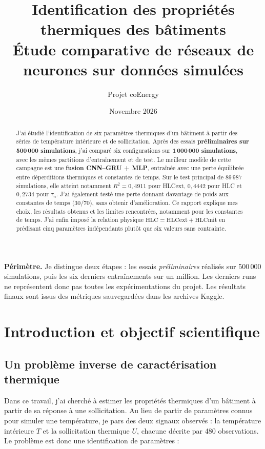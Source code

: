 \documentclass[10pt,a4paper]{article}
\title{\textbf{Identification des propriétés thermiques des bâtiments}\\[0.4em]
       \large Étude comparative de réseaux de neurones sur données simulées}
\author{Projet coEnergy}
\date{Novembre 2026}
\begin{document}
\maketitle
\vspace{-1.4em}
\begin{abstract}
J'ai étudié l'identification de six paramètres thermiques d'un bâtiment à partir des séries de température intérieure et de sollicitation. Après des essais \textbf{préliminaires sur 500\,000 simulations}, j'ai comparé six configurations sur \textbf{1\,000\,000 simulations}, avec les mêmes partitions d'entraînement et de test. Le meilleur modèle de cette campagne est une \textbf{fusion CNN--GRU + MLP}, entraînée avec une perte équilibrée entre déperditions thermiques et constantes de temps. Sur le test principal de 89\,987 simulations, elle atteint notamment $R^2=0{,}4911$ pour HLCext, $0{,}4442$ pour HLC et $0{,}2734$ pour $\tau_n$. J'ai également testé une perte donnant davantage de poids aux constantes de temps (30/70), sans obtenir d'amélioration. Ce rapport explique mes choix, les résultats obtenus et les limites rencontrées, notamment pour les constantes de temps. J'ai enfin imposé la relation physique $\mathrm{HLC}=\mathrm{HLCext}+\mathrm{HLCmit}$ en prédisant cinq paramètres indépendants plutôt que six valeurs sans contrainte.

\end{abstract}

\vspace{-0.25em}
\tableofcontents
\vspace{0.5em}
\noindent\textbf{Périmètre.} Je distingue deux étapes : les essais \emph{préliminaires} réalisés sur 500\,000 simulations, puis les six derniers entraînements sur un million. Les derniers runs ne représentent donc pas toutes les expérimentations du projet. Les résultats finaux sont issus des métriques sauvegardées dans les archives Kaggle.

\section{Introduction et objectif scientifique}

\subsection{Un problème inverse de caractérisation thermique}
Dans ce travail, j'ai cherché à estimer les propriétés thermiques d'un bâtiment à partir de sa réponse à une sollicitation. Au lieu de partir de paramètres connus pour simuler une température, je pars des deux signaux observés : la température intérieure $T$ et la sollicitation thermique $U$, chacune décrite par 480 observations. Le problème est donc une identification de paramètres :
\end{document}
